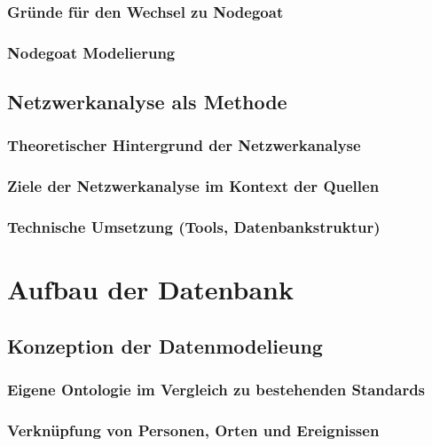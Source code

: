 \documentclass[12pt, a4paper, ngerman, bidi=default]{article}
\begin{document}
\begin{description}
        \subsubsection{Gründe für den Wechsel zu Nodegoat}
        \subsubsection{Nodegoat Modelierung}


  \subsection{Netzwerkanalyse als Methode}
        \subsubsection{Theoretischer Hintergrund der Netzwerkanalyse}
        \subsubsection{Ziele der Netzwerkanalyse im Kontext der Quellen}
        \subsubsection{Technische Umsetzung (Tools, Datenbankstruktur)}

\newpage

     \section{Aufbau der Datenbank}
    \subsection{Konzeption der Datenmodelieung}
      \subsubsection{Eigene Ontologie im Vergleich zu bestehenden Standards}
      \subsubsection{Verknüpfung von Personen, Orten und Ereignissen}
    

\end{description}
\end{document}
